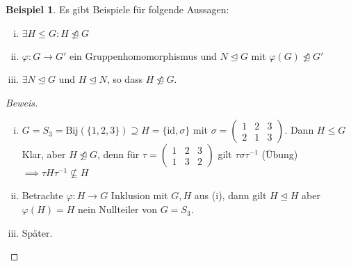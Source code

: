 \documentclass[a4paper]{article}
\theoremstyle{plain}
\theoremstyle{definition}
\newtheorem*{bsp*}{Beispiel}
\begin{document}
\begin{bsp*} Es gibt Beispiele für folgende Aussagen:
  \begin{enumerate}[(i)]
    \item $\exists H \le G : H \not \trianglelefteq G$
    \item $\varphi : G \to G'$ ein Gruppenhomomorphismus und $N \trianglelefteq G$ mit $\varphi(G) \not \trianglelefteq G'$
    \item $\exists N \trianglelefteq G$ und $H \trianglelefteq N$, so dass $H \not \trianglelefteq G$.
  \end{enumerate}
\end{bsp*}
  \begin{proof}[Beweis] \item
  \begin{enumerate}[(i)]
    \item $G = S_{3} = \mathrm{Bij}(\{1,2,3\}) \supseteq H = \{\mathrm{id}, \sigma\}$ mit $\sigma = \begin{pmatrix} 1 & 2 & 3 \\ 2 & 1 & 3\end{pmatrix}$. Dann $H \le G$ Klar, aber $H \not \trianglelefteq G$, denn für $\tau = \begin{pmatrix} 1 & 2 & 3 \\ 1 & 3 & 2\end{pmatrix}$ gilt $\tau \sigma \tau^{-1}$ (Übung) $\implies \tau H\tau^{-1} \not \subseteq H$
    \item Betrachte $\varphi: H \to G$ Inklusion mit $G, H$ aus (i), dann gilt $H \trianglelefteq H$ aber $\varphi(H) = H$ nein Nullteiler von $G = S_{3}$.
    \item Später.
   \end{enumerate}
  \end{proof}
\end{document}
